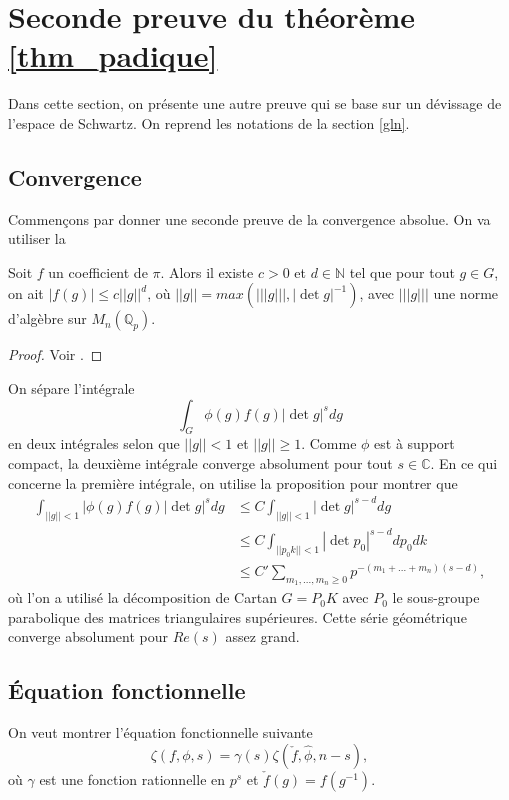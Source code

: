 \section{Seconde preuve du théorème \ref{thm_padique}}

Dans cette section, on présente une autre preuve qui se base sur un dévissage de l'espace de Schwartz. On reprend les notations de la section \ref{gln}. 

\subsection{Convergence}

Commençons par donner une seconde preuve de la convergence absolue. On va utiliser la
\begin{proposition}
Soit $f$ un coefficient de $\pi$. Alors il existe $c > 0$ et $d \in \mathbb{N}$ tel que pour tout $g \in G$, on ait $|f(g)| \leq c ||g||^d$, où $||g|| = max(|||g|||, |\det g|^{-1})$, avec $|||g|||$ une norme d'algèbre sur $M_n(\mathbb{Q}_p)$.
\end{proposition}

\begin{proof}
Voir \cite[Corollaire I.4.4]{waldspurger}.
\end{proof}

On sépare l'intégrale
\begin{equation}
\int_G \phi(g)f(g)|\det g|^s dg
\end{equation}
en deux intégrales selon que $||g|| < 1$ et $||g|| \geq 1$. Comme $\phi$ est à support compact, la deuxième intégrale converge absolument pour tout $s \in \mathbb{C}$. En ce qui concerne la première intégrale, on utilise la proposition pour montrer que
\begin{align}
\int_{||g|| < 1}|\phi(g)f(g)|\det g|^s dg &\leq C \int_{||g|| < 1} |\det g|^{s-d} dg \\
&\leq C \int_{||p_0k|| < 1} |\det p_0|^{s-d}dp_0dk \\
&\leq C' \sum_{m_1, ..., m_n \geq 0} p^{-(m_1+...+m_n)(s-d)},
\end{align}
où l'on a utilisé la décomposition de Cartan $G=P_0K$ avec $P_0$ le sous-groupe parabolique des matrices triangulaires supérieures. Cette série géométrique converge absolument pour $Re(s)$ assez grand.

\subsection{Équation fonctionnelle}
On veut montrer l'équation fonctionnelle suivante
\begin{equation}
\zeta(f, \phi, s) = \gamma(s) \zeta(\check{f}, \hat{\phi}, n-s),
\end{equation}
où $\gamma$ est une fonction rationnelle en $p^s$ et $\check{f}(g) = f(g^{-1})$.

